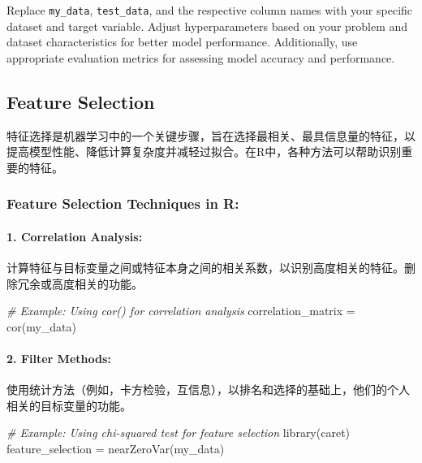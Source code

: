 \documentclass[
]{article}
\newenvironment{Shaded}{}{}
\newcommand{\CommentTok}[1]{\textcolor[rgb]{0.38,0.63,0.69}{\textit{#1}}}
\newcommand{\FunctionTok}[1]{\textcolor[rgb]{0.02,0.16,0.49}{#1}}
\newcommand{\NormalTok}[1]{#1}
\newcommand{\OtherTok}[1]{\textcolor[rgb]{0.00,0.44,0.13}{#1}}
\begin{document}
Replace \texttt{my\_data}, \texttt{test\_data}, and the respective
column names with your specific dataset and target variable. Adjust
hyperparameters based on your problem and dataset characteristics for
better model performance. Additionally, use appropriate evaluation
metrics for assessing model accuracy and performance.

\hypertarget{feature-selection}{%
\subsection{Feature Selection}\label{feature-selection}}

特征选择是机器学习中的一个关键步骤，旨在选择最相关、最具信息量的特征，以提高模型性能、降低计算复杂度并减轻过拟合。在R中，各种方法可以帮助识别重要的特征。

\hypertarget{feature-selection-techniques-in-r}{%
\subsubsection{Feature Selection Techniques in
R:}\label{feature-selection-techniques-in-r}}

\hypertarget{1-correlation-analysis}{%
\paragraph{\texorpdfstring{1. \textbf{Correlation
Analysis:}}{1. Correlation Analysis:}}\label{1-correlation-analysis}}

计算特征与目标变量之间或特征本身之间的相关系数，以识别高度相关的特征。删除冗余或高度相关的功能。

\begin{Shaded}
\begin{Highlighting}[]
\CommentTok{\# Example: Using cor() for correlation analysis}
\NormalTok{correlation\_matrix }\OtherTok{=} \FunctionTok{cor}\NormalTok{(my\_data)}
\end{Highlighting}
\end{Shaded}

\hypertarget{2-filter-methods}{%
\paragraph{\texorpdfstring{2. \textbf{Filter
Methods:}}{2. Filter Methods:}}\label{2-filter-methods}}

使用统计方法（例如，卡方检验，互信息），以排名和选择的基础上，他们的个人相关的目标变量的功能。

\begin{Shaded}
\begin{Highlighting}[]
\CommentTok{\# Example: Using chi{-}squared test for feature selection}
\FunctionTok{library}\NormalTok{(caret)}
\NormalTok{feature\_selection }\OtherTok{=} \FunctionTok{nearZeroVar}\NormalTok{(my\_data)}
\end{Highlighting}
\end{Shaded}
\end{document}
